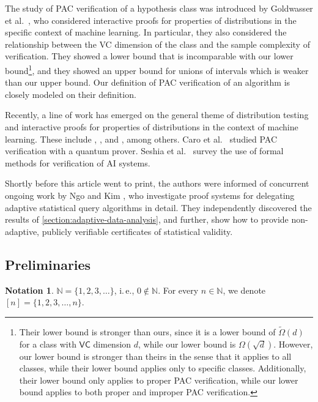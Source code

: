\documentclass[11pt]{article}
\numberwithin{equation}{section}
\theoremstyle{definition}
\theoremstyle{plain}
\newcommand{\ie}{i.\,e.}
\theoremstyle{definition}\newtheorem{notation}[theorem]{Notation}\theoremstyle{plain}\raggedbottom
\newcommand{\roundBrackets}[1]{
	\mathopen{}\left(#1\right)\mathclose{}
}
\newcommand{\OmegaOf}[1]{\Omega\roundBrackets{#1}}
\newcommand{\tildeOmegaOf}[1]{\widetilde{\Omega}\roundBrackets{#1}}
\newcommand{\bbN}{\mathbb{N}}
\newcommand{\1}{\mathds{1}}
\begin{document}
The study of PAC verification of a hypothesis class was introduced by Goldwasser et al.\ \cite{GoldwasserRSY21}, who considered interactive proofs for properties of distributions in the specific context of machine learning. In particular, they also considered the relationship between the VC dimension of the class and the sample complexity of verification. They showed a lower bound that is incomparable with our lower bound\footnote{%
	Their lower bound is stronger than ours, since it is a lower bound of $\tildeOmegaOf{d}$ for a class with $\mathsf{VC}$ dimension $d$, while our lower bound is $\OmegaOf{\sqrt{d}}$. However, our lower bound is stronger than theirs in the sense that it applies to all classes, while their lower bound applies only to specific classes. Additionally, their lower bound only applies to proper PAC verification, while our lower bound applies to both proper and improper PAC verification.%
}, and they showed an upper bound for unions of intervals which is weaker than our upper bound. Our definition of PAC verification of an algorithm is closely modeled on their definition.

Recently, %
a line of work has emerged  %
on the general theme of distribution testing and interactive proofs for properties of distributions in the context of machine learning. These include \cite{CanettiK21}, \cite{abs-2108-12099}, \cite{abs-2204-07196} and \cite{HermanR22}, among others. Caro et al.\ \cite{DBLP:journals/corr/abs-2306-04843} studied PAC verification with a quantum prover. Seshia et al.\ \cite{DBLP:journals/cacm/SeshiaSS22} survey the use of formal methods for verification of AI systems.

Shortly before this article went to print, the authors were informed of concurrent ongoing work by Ngo and Kim \cite{NgoKim}, who investigate proof systems for delegating adaptive statistical query algorithms in detail. They independently discovered the results of \cref{section:adaptive-data-analysis}, and further, show how to provide non-adaptive, publicly verifiable certificates of statistical validity.


\subsection{Preliminaries}\label{section:preliminaries}

\begin{notation}
	$\bbN = \{1,2,3,\dots\}$, \ie, $0 \notin \bbN$. For every $n \in \bbN$, we denote $[n] = \{1,2,3,\dots,n\}$.
\end{notation}
\end{document}
